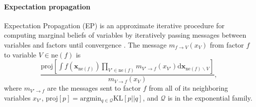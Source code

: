 \documentclass[english]{article}
\theoremstyle{plain}
\theoremstyle{plain}
\newcommand{\bx}{\mathbf{x}}				%
\newcommand{\factor}{f}				%
\newcommand{\outV}{V}                         %
\newcommand{\fis}[1]{\mathrm{ne}(#1)}   	%
\newcommand{\fx}[1]{ \mathbf{x}_{\mathrm{ne}(#1)} }   	%
\newcommand{\msg}[2]{m_{#1 \rightarrow #2}}			%
\newcommand{\diffd}{\mathrm{d}}
\newcommand{\projP}[1]{\mathrm{proj} \left [ #1 \right]}
\newcommand{\argmin}[1]{\mathrm{arg}\mathrm{min}_{#1}}
\newcommand{\kld}[2]{\mathrm{KL} \left [ #1 || #2 \right ]}
\begin{document}

\paragraph{Expectation propagation}


Expectation Propagation (EP) is an approximate iterative procedure for
computing marginal beliefs of variables by iteratively passing messages between
variables and factors until convergence \citep{Minka2001}.  The message $\msg{
\factor }{\outV}(x_{\outV})$  from factor $\factor$ to variable
$\outV\in\fis{\factor}$ is 
%
\begin{equation}
\frac{ \projP{ 
\int \factor (\fx{\factor}) \prod_{\outV' \in \fis{\factor}} \msg{\outV'}{\factor}(x_{\outV'}) \diffd 
\bx_{\fis{\factor} \backslash \outV}} }
{\msg{\outV}{\factor}(x_{\outV})},
%
\label{eq:msgPassing:EP}
\end{equation}
%
where $\msg{\outV'}{\factor}$ are the messages sent to factor $\factor$ from all of its neighboring variables $x_{\outV'}$,
$\projP{p} = \argmin{q \in \mathcal{Q}} \kld{p}{q}$, and $\mathcal{Q}$ is in the exponential family.
\end{document}
